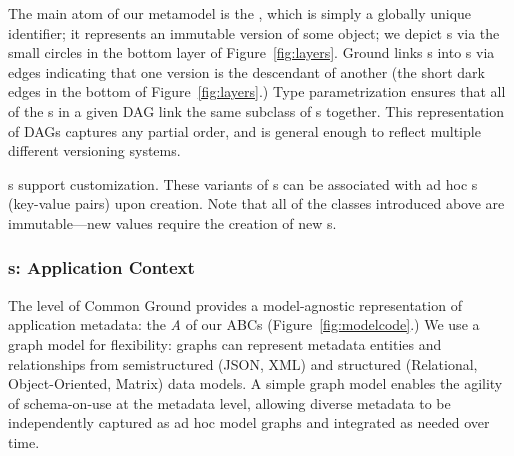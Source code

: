 \documentclass{sig-alternate}
\begin{document}
The main atom of our metamodel is the \version, which is simply a globally unique identifier; it represents an immutable version of some object; we
depict \version{}s via the small circles in the bottom layer of Figure~\ref{fig:layers}. 
Ground links {\version}s into s via  edges
indicating that one version is the descendant of another (the short dark edges in the bottom of Figure~\ref{fig:layers}.)
Type parametrization ensures that all of the s in a given DAG link the same subclass of {\version}s together.
This representation of DAGs captures any partial order, and is general enough to reflect multiple different versioning systems.

s support customization. These variants of \version{}s can be associated with
ad hoc {\gtag}s (key-value pairs) upon creation. Note that all of the classes introduced above are immutable---new values require the creation of new \version{}s.

\subsubsection{{\ModelGraph}s: Application Context}


The \modelgraph level of Common Ground provides a model-agnostic representation of application metadata: the \emph{A} of our ABCs (Figure~\ref{fig:modelcode}.) 
We use a graph model for flexibility: graphs can represent metadata entities and relationships from
semistructured (JSON, XML) and structured (Relational, Object-Oriented, Matrix) data models. A simple graph model enables 
the agility of schema-on-use at the metadata level, allowing diverse metadata to be independently captured as ad hoc model graphs and 
integrated as needed over time.
\end{document}
